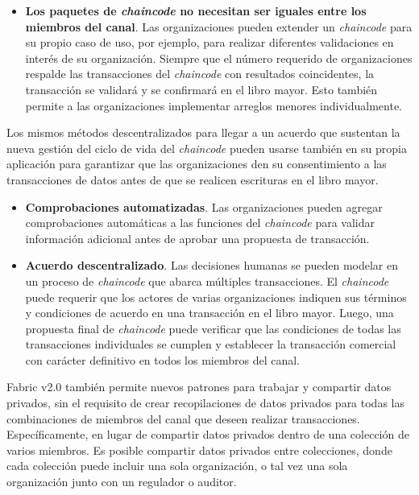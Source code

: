 {\begin{itemize}
\item {\bf Los paquetes de \emph{chaincode} no necesitan ser iguales entre los miembros del canal}. Las organizaciones pueden extender un \emph{chaincode} para su propio caso de uso, por ejemplo, para realizar diferentes validaciones en inter\'es de su organizaci\'on. Siempre que el n\'umero requerido de organizaciones respalde las transacciones del \emph{chaincode} con resultados coincidentes, la transacci\'on se validar\'a y se confirmar\'a en el libro mayor. Esto tambi\'en permite a las organizaciones implementar arreglos menores individualmente.
\end{itemize}

Los mismos m\'etodos descentralizados para llegar a un acuerdo que sustentan la nueva gesti\'on del ciclo de vida del \emph{chaincode} pueden usarse tambi\'en en su propia aplicaci\'on para garantizar que las organizaciones den su consentimiento a las transacciones de datos antes de que se realicen escrituras en el libro mayor.\\

\begin{itemize}
\item {\bf Comprobaciones automatizadas}. Las organizaciones pueden agregar comprobaciones autom\'aticas a las funciones del \emph{chaincode} para validar informaci\'on adicional antes de aprobar una propuesta de transacci\'on.

\item {\bf Acuerdo descentralizado}. Las decisiones humanas se pueden modelar en un proceso de \emph{chaincode} que abarca m\'ultiples transacciones. El \emph{chaincode} puede requerir que los actores de varias organizaciones indiquen sus t\'erminos y condiciones de acuerdo en una transacci\'on en el libro mayor. Luego, una propuesta final de \emph{chaincode} puede verificar que las condiciones de todas las transacciones individuales se cumplen y establecer la transacci\'on comercial con car\'acter definitivo en todos los miembros del canal.
\end{itemize}

Fabric v2.0 tambi\'en permite nuevos patrones para trabajar y compartir datos privados, sin el requisito de crear recopilaciones de datos privados para todas las combinaciones de miembros del canal que deseen realizar transacciones. Espec\'ificamente, en lugar de compartir datos privados dentro de una colecci\'on de varios miembros. Es posible compartir datos privados entre colecciones, donde cada colecci\'on puede incluir una sola organizaci\'on, o tal vez una sola organizaci\'on junto con un regulador o auditor.\\

}
